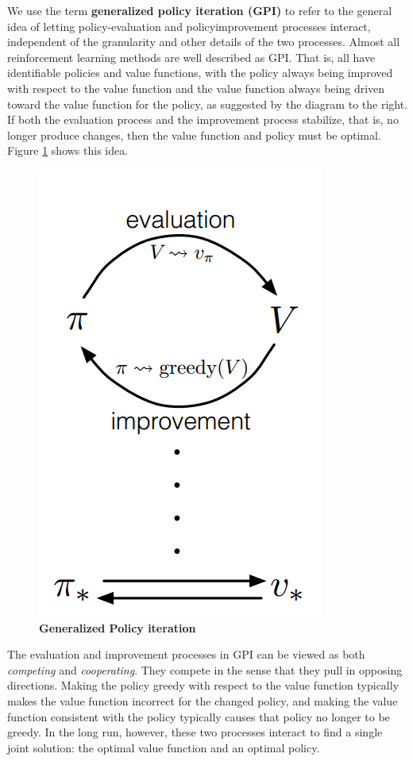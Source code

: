 \documentclass[11pt]{article}
\begin{document}
We use the term \textbf{generalized policy iteration (GPI)} to refer to the general idea of letting policy-evaluation and policyimprovement processes interact, independent of the granularity and other details of the two processes. Almost all reinforcement learning methods are well described as GPI. That is, all have identifiable policies and value functions, with the policy always being improved with respect to the value function and the value function always being driven toward the value function for the policy, as suggested by the diagram to the right. If both the evaluation process and the improvement process stabilize, that is, no longer produce changes, then the value function and policy
must be optimal.  Figure \ref{fig: GPI} shows this idea. 
\begin{figure}
\begin{minipage}[t]{1\linewidth}
  \centering
  \centerline{\includegraphics[scale = 0.3]{GPI.png}}
\end{minipage}
\caption{\footnotesize{\textbf{Generalized Policy iteration}}}
\label{fig: GPI}
\end{figure}

The evaluation and improvement processes in GPI can be viewed as both \emph{competing} and \emph{cooperating}. They compete in the sense that they pull in opposing directions. Making the policy greedy with respect to the value function typically makes the value function incorrect for the changed policy, and making the value function consistent with the policy typically causes that policy no longer to be greedy. In the long run, however, these two processes interact to find a single joint solution: the optimal value function and an optimal policy.
\end{document}

